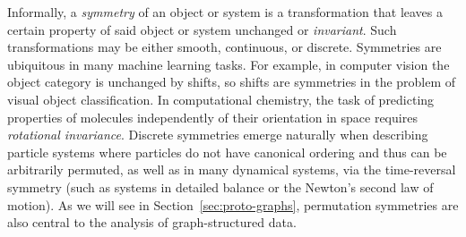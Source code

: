 Informally, a {\em symmetry} of an object or system is a transformation that leaves a certain property of said object or system unchanged or {\em invariant}.
Such transformations may be either smooth, continuous, or discrete.
%
Symmetries are ubiquitous in many machine learning tasks.
For example, in computer vision the object category is unchanged by shifts, so shifts are symmetries in the problem of visual object classification.
%
In computational chemistry, the task of predicting properties of molecules independently of their orientation in space requires {\em rotational invariance}. 
%
Discrete symmetries emerge naturally when describing particle systems where particles do not have canonical ordering and thus can be arbitrarily permuted, as well as
in many dynamical systems, via the time-reversal symmetry (such as systems in detailed balance or the Newton's second law of motion). %
%
As we will see in Section~\ref{sec:proto-graphs}, permutation symmetries are also central to the analysis of graph-structured data. %

